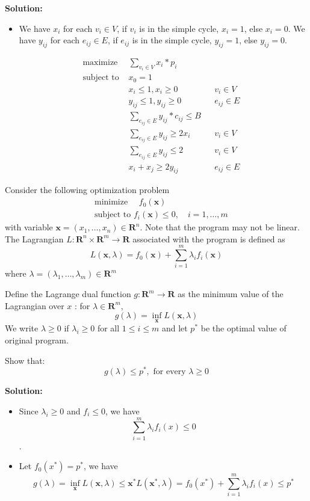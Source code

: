 \documentclass{article}
\newcounter{exercise}
\newcommand{\<}{
    \langle}
\renewcommand{\>}{
    \rangle}
\begin{document}
{\textbf{Solution:}
\begin{itemize}
	\item We have $x_i$ for each $v_i\in V$, if $v_i$ is in the simple cycle, $x_i=1$, else $x_i=0$. We have $y_{ij}$ for each $e_{ij}\in E$, if $e_{ij}$ is in the simple cycle, $y_{ij}=1$, else $y_{ij}=0$.
\end{itemize}

	$$\begin{aligned}
	&\text { maximize }  & \sum_{v_i\in V}{x_i*p_i} && \\
	&\text { subject to }  & x_0 = 1 & & \\
	& & x_i\leq 1,x_i\geq 0 & &v_i\in V\\
	& & y_{ij}\leq 1,y_{ij}\geq 0 & &e_{ij}\in E\\
	& & \sum_{e_{ij}\in E}{y_{ij}*c_{ij}}\leq B & & \\
	& & \sum_{e_{ij}\in E}{y_{ij}}\geq 2x_{i} & & v_i\in V \\
	& & \sum_{e_{ij}\in E}{y_{ij}}\leq 2 & & v_i\in V \\
	& & x_i+x_j\geq 2y_{ij} & & e_{ij}\in E
	\end{aligned}$$
	
\newpage




\begin{exercise}
	Consider the following optimization problem
	$$\begin{aligned}
		&\text { minimize } \quad f_{0}(\mathbf{x})\\
		&\text { subject to } f_{i}(\mathbf{x}) \leq 0, \quad i=1, \ldots, m
	\end{aligned}$$
	with variable $\mathbf{x}=\left(x_{1}, \ldots, x_{n}\right) \in \mathbf{R}^{n} .$ Note that the program may not be linear. The Lagrangian
	$L: \mathbf{R}^{n} \times \mathbf{R}^{m} \rightarrow \mathbf{R}$ associated with the program is defined as
	$$
	L(\mathbf{x}, \lambda)=f_{0}(\mathbf{x})+\sum_{i=1}^{m} \lambda_{i} f_{i}(\mathbf{x})
	$$
	where $\lambda=\left(\lambda_{1}, \ldots, \lambda_{m}\right) \in \mathbf{R}^{m}$
	
	Define the Lagrange dual function $g: \mathbf{R}^{m} \rightarrow \mathbf{R}$ as the minimum value of the Lagrangian over $x$ :
	for $\lambda \in \mathbf{R}^{m}$,
	$$
	g(\lambda)=\inf _{\mathbf{x}} L(\mathbf{x}, \lambda)
	$$
	We write $\lambda \geq 0$ if $\lambda_{i} \geq 0$ for all $1 \leq i \leq m$ and let $p^{*}$ be the optimal value of original program.
	
	Show that:
	$$
	g(\lambda) \leq p^{*} , \text{ for every } \lambda \geq 0
	$$
\end{exercise}
\textbf{Solution:}
\begin{itemize}
    \item Since $\lambda_{i}\geq 0$ and $f_{i}\leq 0$, we have 
		$$\sum_{i=1}^{m}{\lambda_{i}f_i(x)}\leq 0$$.
    \item Let $f_0(x^*)=p^*$, we have 
		$$ g(\lambda)=\inf _{\mathbf{x}} L(\mathbf{x}, \lambda) \leq \mathbf{x^*} L(\mathbf{x^*}, \lambda) = f_0(x^*) + \sum_{i=1}^{m}{\lambda_{i}f_i(x)}\leq p^* $$
\end{itemize}
\newpage



}
\end{document}
